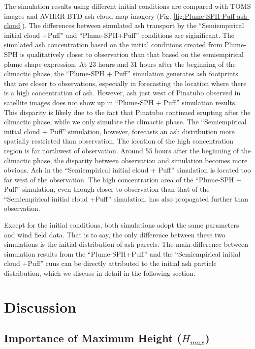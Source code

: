 \documentclass[utf8]{frontiersSCNS} %
\begin{document}
The simulation results using different initial conditions are compared with TOMS images and AVHRR BTD ash cloud map imagery (Fig. \ref{fig:Plume-SPH-Puff-ash-cloud}).  The differences between simulated ash transport by the ``Semiempirical initial cloud +Puff'' and ``Plume-SPH+Puff'' conditions are siginificant. The simulated ash concentration based on the initial conditions created from Plume-SPH is qualitatively closer to observation than that based on the semiempirical plume shape expression. At 23 hours and 31 hours after the beginning of the climactic phase, the ``Plume-SPH + Puff'' simulation generates ash footprints that are  closer to observations, especially in forecasting the location where there is a high concentration of ash. However, ash just west of Pinatubo observed in satellite images does not show up in ``Plume-SPH + Puff'' simulation results. This disparity is likely due to the fact that Pinatubo continued erupting after the climactic phase, while we only simulate the climactic phase. The ``Semiempirical initial cloud + Puff'' simulation, however, forecasts an ash distribution more spatially restricted than observation. The location of the high concentration region is far northwest of observation.  Around 55 hours after the beginning of the climactic phase, the disparity between observation and simulation becomes more obvious. Ash in the ``Semiempirical initial cloud + Puff'' simulation is located too far west of the observation. The high concentration area of the ``Plume-SPH + Puff'' simulation, even though closer to observation than that of the ``Semiempirical initial cloud +Puff'' simulation, has also propagated further than observation.

Except for the initial conditions, both simulations adopt the same parameters and wind field data. That is to say, the only difference between these two simulations is the initial distribution of ash parcels. The main difference between simulation results from the ``Plume-SPH+Puff'' and the ``Semiempirical initial cloud +Puff'' runs can be directly attributed to the initial ash particle distribution, which we discuss in detail in the following section.


\section{Discussion}
\subsection{Importance of Maximum Height ($H_{max}$)}
\end{document}
